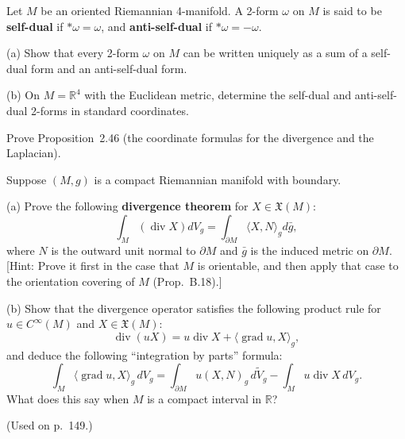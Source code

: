 \begin{exercise}\label{prob:self-dual-anti-self-dual}
\leanok
{}
Let $M$ be an oriented Riemannian 4-manifold. A 2-form $\omega$ on $M$ is said to be \textbf{self-dual} if $*\omega = \omega$, and \textbf{anti-self-dual} if $*\omega = -\omega$.

(a) Show that every 2-form $\omega$ on $M$ can be written uniquely as a sum of a self-dual form and an anti-self-dual form.

(b) On $M = \mathbb{R}^4$ with the Euclidean metric, determine the self-dual and anti-self-dual 2-forms in standard coordinates.
\end{exercise}

\begin{exercise}\label{prob:divergence-laplacian-formulas-ch2}
Prove Proposition~2.46 (the coordinate formulas for the divergence and the Laplacian).
\end{exercise}

\begin{exercise}\label{prob:divergence-theorem}
Suppose $(M,g)$ is a compact Riemannian manifold with boundary.

(a) Prove the following \textbf{divergence theorem} for $X \in \mathfrak{X}(M)$:
\[
\int_M (\operatorname{div} X) dV_g = \int_{\partial M} \langle X, N\rangle_g d\bar{g},
\]
where $N$ is the outward unit normal to $\partial M$ and $\bar{g}$ is the induced metric on $\partial M$. [Hint: Prove it first in the case that $M$ is orientable, and then apply that case to the orientation covering of $M$ (Prop.~B.18).]

(b) Show that the divergence operator satisfies the following product rule for
$u \in C^\infty(M)$ and $X \in \mathfrak{X}(M)$:
\[
\operatorname{div}(uX) = u \operatorname{div} X + \langle \operatorname{grad} u, X \rangle_g,
\]
and deduce the following ``integration by parts'' formula:
\[
\int_M \langle \operatorname{grad} u, X \rangle_g \, dV_g = \int_{\partial M} u(X,N)_g \, d\tilde{V}_g - \int_M u \operatorname{div} X \, dV_g.
\]
What does this say when $M$ is a compact interval in $\mathbb{R}$?

(Used on p.\ 149.)
\end{exercise}

